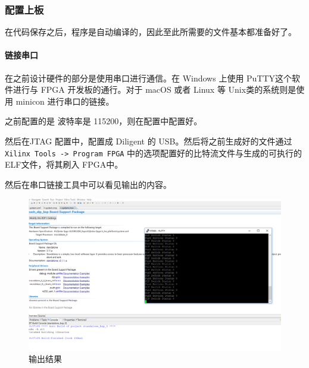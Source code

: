 \documentclass{ctexart}
\begin{document}
        \subsubsection{配置上板}
        
        在代码保存之后，程序是自动编译的，因此至此所需要的文件基本都准备好了。
        
        \paragraph{链接串口}
        
        在之前设计硬件的部分是使用串口进行通信。在 Windows 上使用
        PuTTY这个软件进行与 FPGA 开发板的通行。对于 macOS 或者 Linux
        等 Unix类的系统则是使用 minicon 进行串口的链接。
        
        之前配置的是 波特率是 115200，则在配置中配置好。
        
        然后在JTAG 配置中，配置成 Diligent 的 USB。然后将之前生成好的文件通过
        \verb|Xilinx Tools -> Program FPGA|  中的选项配置好的比特流文件与生成的可执行的ELF文件，将其刷入 FPGA中。

        然后在串口链接工具中可以看见输出的内容。
        
        \begin{figure}
\centering
\includegraphics[width=1\linewidth]{report3-5}
\caption{输出结果}
\label{fig:report3-5}
\end{figure}

        



        
\end{document}
